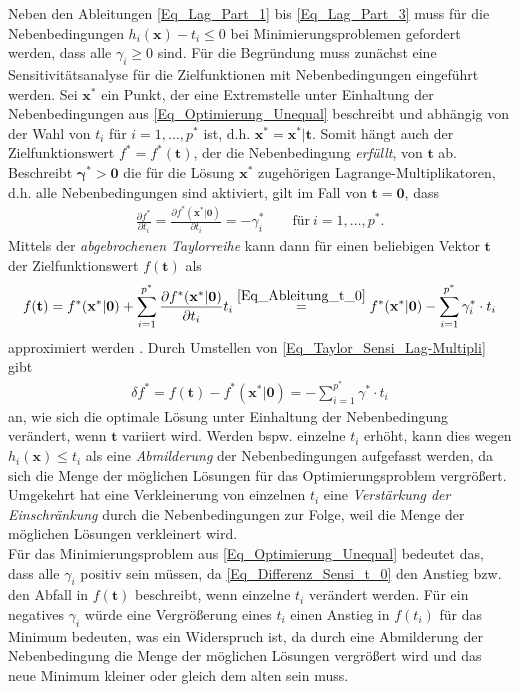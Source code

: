 \documentclass[12pt, a4paper]{report}\usepackage[]{graphicx}\usepackage[]{color}
\begin{document}
\begin{appendix}
Neben den Ableitungen \eqref{Eq_Lag_Part_1} bis \eqref{Eq_Lag_Part_3} muss für die Nebenbedingungen $h_i(\mathbf{x}) - t_i \le 0$ bei Minimierungsproblemen gefordert werden, dass alle $\gamma_i \ge 0$ sind. Für die Begründung muss zunächst eine Sensitivitätsanalyse für die Zielfunktionen mit Nebenbedingungen eingeführt werden. Sei $\mathbf{x}^*$ ein Punkt, der eine Extremstelle unter Einhaltung der Nebenbedingungen aus \eqref{Eq_Optimierung_Unequal} beschreibt und abhängig von der Wahl von $t_i$ für $i=1,\dots,p^*$ ist, d.h. $\mathbf{x}^*=\mathbf{x}^*|\mathbf{t}$. Somit hängt auch der Zielfunktionswert $f^*=f^*(\mathbf{t})$, der die Nebenbedingung \textit{erfüllt}, von $\mathbf{t}$ ab. Beschreibt $\boldsymbol{\gamma}^* > \mathbf{0}$ die für die Lösung $\mathbf{x}^*$ zugehörigen Lagrange-Multiplikatoren, d.h. alle Nebenbedingungen sind aktiviert, gilt im Fall von $\mathbf{t}=\mathbf{0}$, dass
\begin{align}\label{Eq_Ableitung_t_0}
\frac{\partial f^*}{\partial t_i}=\frac{\partial f^*(\mathbf{x}^*|\mathbf{0})}{\partial t_i}=-\gamma^*_i \qquad \text{für} \ i=1,\dots,p^* .
\end{align}
Mittels der \textit{abgebrochenen Taylorreihe} kann dann für einen beliebigen Vektor $\mathbf{t}$ der Zielfunktionswert $f(\mathbf{t})$ als 
\begin{align}\label{Eq_Taylor_Sensi_Lag-Multipli}
f(\mathbf{t})=f^*(\mathbf{x}^*|\mathbf{0}) + \sum_{i=1}^{p^*} \frac{\partial f^*(\mathbf{x}^*|\mathbf{0})}{\partial t_i} t_i \stackrel{\eqref{Eq_Ableitung_t_0}}{=} f^*(\mathbf{x}^*|\mathbf{0}) -\sum_{i=1}^{p^*} \gamma^*_i \cdot t_i
\end{align}
approximiert werden  \cite{arora2011introductionOptimum}. Durch Umstellen von \eqref{Eq_Taylor_Sensi_Lag-Multipli} gibt
\begin{align}\label{Eq_Differenz_Sensi_t_0}
\delta f^*=f(\mathbf{t})-f^*(\mathbf{x}^*|\mathbf{0})=- \sum_{i=1}^{p^*} \gamma^* \cdot t_i
\end{align}
an, wie sich die optimale Lösung unter Einhaltung der Nebenbedingung verändert, wenn $\mathbf{t}$ variiert wird. Werden bspw. einzelne $t_i$ erhöht, kann dies wegen $h_i(\mathbf{x}) \le t_i$ als eine \textit{Abmilderung} der Nebenbedingungen aufgefasst werden, da sich die Menge der möglichen Lösungen für das Optimierungsproblem vergrößert. Umgekehrt hat eine Verkleinerung von einzelnen $t_i$ eine \textit{Verstärkung der Einschränkung} durch die Nebenbedingungen zur Folge, weil die Menge der möglichen Lösungen verkleinert wird.\\
Für das Minimierungsproblem aus \eqref{Eq_Optimierung_Unequal} bedeutet das, dass alle $\gamma_i$ positiv sein müssen, da \eqref{Eq_Differenz_Sensi_t_0} den Anstieg bzw. den Abfall in $f(\mathbf{t})$ beschreibt, wenn einzelne $t_i$ verändert werden. Für ein negatives $\gamma_i$ würde eine Vergrößerung eines $t_i$ einen Anstieg in $f(t_i)$ für das Minimum bedeuten, was ein Widerspruch ist, da durch eine Abmilderung der Nebenbedingung die Menge der möglichen Lösungen vergrößert wird und das neue Minimum kleiner oder gleich dem alten sein muss.


\end{appendix}
\end{document}
